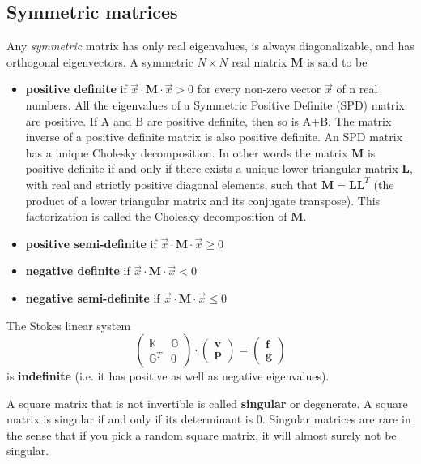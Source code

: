 \subsection{Symmetric matrices}

Any {\sl symmetric} matrix 
has only real eigenvalues,
is always diagonalizable,
and has orthogonal eigenvectors.
A symmetric $N\times N$ real matrix ${\bm M}$ is said to be
\begin{itemize}
\item {\bf positive definite} if $\vec x \cdot {\bm M} \cdot \vec x >0$ for every non-zero vector $\vec x$ of n real numbers. All the eigenvalues of a  Symmetric Positive Definite (SPD) matrix are positive.
 If A and B are positive definite, then so is A+B.
The matrix inverse of a positive definite matrix is also positive definite.
An SPD matrix has a unique Cholesky decomposition. In other words the matrix ${\bm M}$ 
is positive definite if and only if there exists a unique
lower triangular matrix ${\bm L}$, with real and strictly positive diagonal elements, 
such that ${\bm M} = {\bm L}{\bm L}^T$
(the product of a lower triangular matrix and its conjugate transpose).
This factorization is called the Cholesky decomposition of ${\bm M}$.

\item {\bf positive semi-definite} if $\vec x \cdot {\bm M} \cdot  \vec x \geq 0$
\item {\bf negative definite} if $\vec x \cdot {\bm M} \cdot \vec x < 0$
\item {\bf negative semi-definite} if $\vec x \cdot {\bm M} \cdot \vec x \leq 0$
\end{itemize}

The Stokes linear system
\[
\left( \begin{array}{cc}
\mathbb{K} & \mathbb{G}  \\ \mathbb{G}^T &  0
\end{array} \right) \cdot
\left( \begin{array}{c}  {\bm v} \\ {\bm p}  \end{array} \right) = 
\left( \begin{array}{c}  {\bm f} \\ {\bm g}  \end{array} \right) 
\]
is {\bf indefinite} (i.e. it has positive as well as negative eigenvalues).

A square matrix that is not invertible is called {\bf singular} or degenerate. A square matrix is singular if and only if its determinant is 0. Singular matrices are rare in the sense that if you pick a random square matrix, it will almost surely not be singular.

